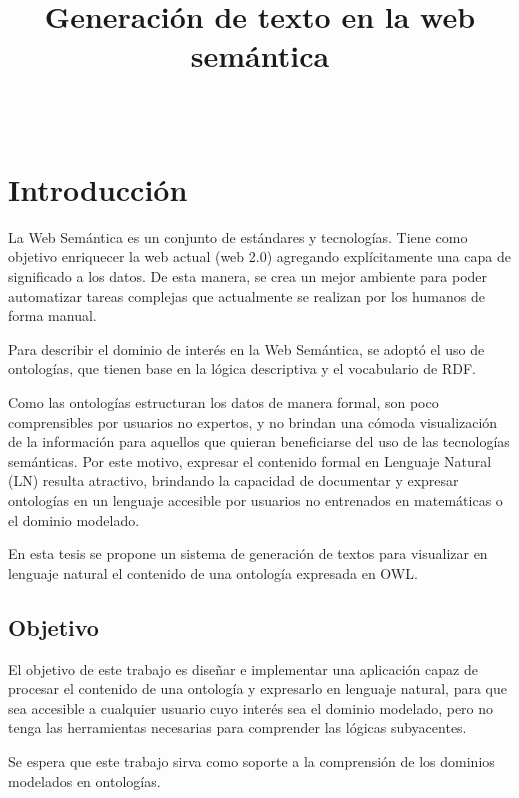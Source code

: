 \documentclass[11pt,a4paper,spanish]{book}
\begin{document}
	
\title{Generación de texto en la web semántica}
\author{\ }
\date{}
\maketitle

\frontmatter
\tableofcontents
\mainmatter

\chapter{Introducción}
La Web Semántica es un conjunto de estándares y tecnologías. Tiene como objetivo enriquecer la web actual (web 2.0) agregando explícitamente una capa de significado a los datos. De esta manera, se crea un mejor ambiente para poder automatizar tareas complejas que actualmente se realizan por los humanos de forma manual. 

Para describir el dominio de interés en la Web Semántica, se adoptó el uso de ontologías, que tienen base en la lógica descriptiva y el vocabulario de RDF.

Como las ontologías estructuran los datos de manera formal, son poco comprensibles por usuarios no expertos, y no brindan una cómoda visualización de la información para aquellos que quieran beneficiarse del uso de las tecnologías semánticas. Por este motivo, expresar el contenido formal en Lenguaje Natural (LN) resulta atractivo, brindando la capacidad de documentar y expresar ontologías en un lenguaje accesible por usuarios no entrenados en matemáticas o el dominio modelado. 

En esta tesis se propone un sistema de generación de textos para visualizar en lenguaje natural el contenido de una ontología expresada en OWL.

\section{Objetivo}\label{Intro:objetivo}
El objetivo de este trabajo es diseñar e implementar una aplicación capaz de procesar el contenido de una ontología y expresarlo en lenguaje natural, para que sea accesible a cualquier usuario cuyo interés sea el dominio modelado, pero no tenga las herramientas necesarias para comprender las lógicas subyacentes.

Se espera que este trabajo sirva como soporte a la comprensión de los dominios modelados en ontologías.
\end{document}
